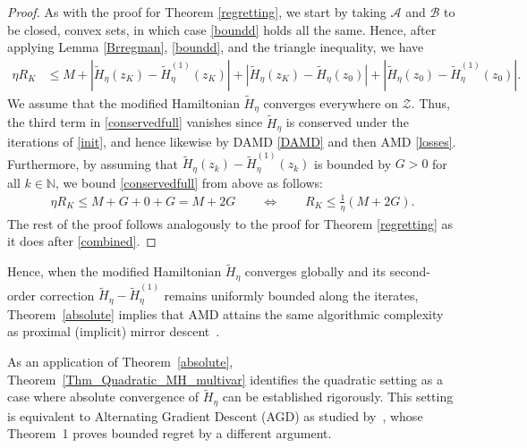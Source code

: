 \documentclass[11pt]{article}
\newcommand{\Z}{\mathcal{Z}}
\newcommand{\N}{\mathbb{N}}
\begin{document}
\begin{proof}
    As with the proof for Theorem \ref{regretting}, we start by taking $\mathcal{A}$ and $\mathcal{B}$ to be closed, convex sets, in which case \eqref{boundd} holds all the same. Hence, after applying Lemma \ref{Brregman}, \eqref{boundd}, and the triangle inequality, we have
\begin{align}
    \eta R_{K}
    &\leq M+\left|\widetilde{H}_{\eta}\left(z_{K}\right)-\widetilde{H}_{\eta}^{(1)}\left(z_{K}\right)\right|+\left|\widetilde{H}_{\eta}\left(z_{K}\right)-\widetilde{H}_{\eta}\left(z_{0}\right)\right|+\left|\widetilde{H}_{\eta}\left(z_{0}\right)-\widetilde{H}_{\eta}^{(1)}\left(z_{0}\right)\right|.\label{conservedfull}
\end{align}
We assume that the modified Hamiltonian $\widetilde{H}_{\eta}$ converges everywhere on $\Z$. Thus, the third term in \eqref{conservedfull} vanishes since $\widetilde{H}_{\eta}$ is conserved under the iterations of \eqref{init}, and hence likewise by DAMD \eqref{DAMD} and then AMD \eqref{losses}. Furthermore, by assuming that $\widetilde{H}_{\eta}(z_k)-\widetilde{H}_{\eta}^{(1)}(z_k)$ is bounded by $G>0$ for all $k\in\N$, we bound \eqref{conservedfull} from above as follows:
\begin{gather}
    \eta R_{K}\leq M+G+0+G=M+2G\qquad\iff\qquad R_{K}\leq\frac{1}{\eta}\left(M+2G\right).\nonumber
\end{gather}
The rest of the proof follows analogously to the proof for Theorem \ref{regretting} as it does after \eqref{combined}.
\end{proof}

Hence, when the modified Hamiltonian $\widetilde{H}_{\eta}$ converges globally and its second-order correction $\widetilde{H}_{\eta}-\widetilde{H}_{\eta}^{(1)}$ remains uniformly bounded along the iterates, Theorem~\ref{absolute} implies that AMD attains the same algorithmic complexity as proximal (implicit) mirror descent~\citep{nemirovski2004mirrorprox,Wibisono2022}. 

As an application of Theorem~\ref{absolute}, Theorem~\ref{Thm_Quadratic_MH_multivar} identifies the quadratic setting as a case where absolute convergence of $\widetilde{H}_{\eta}$ can be established rigorously. This setting is equivalent to Alternating Gradient Descent (AGD) as studied by~\cite{pmlr-v125-bailey20a}, whose Theorem~1 proves bounded regret by a different argument. 
\end{document}
